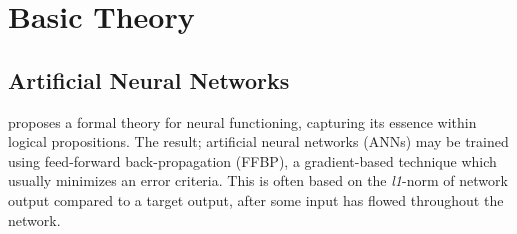 
\chapter{Basic Theory}

\section{Artificial Neural Networks}

\cite{McCulloch1943} proposes a formal theory for neural functioning, capturing its essence within logical propositions.
The result; artificial neural networks (ANNs) may be trained using feed-forward back-propagation (FFBP), a gradient-based technique which usually minimizes an error criteria. This is often based on the \textit{l1}-norm of network output compared to a target output, after some input has flowed throughout the network.

